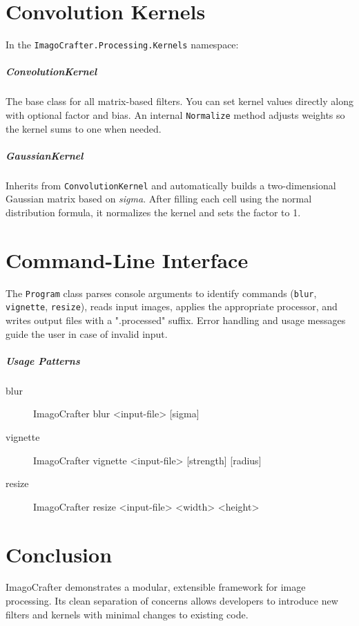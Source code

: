 \documentclass[12pt,a4paper]{report}
\begin{document}
\chapter{Convolution Kernels}
In the \texttt{ImagoCrafter.Processing.Kernels} namespace:

\paragraph{ConvolutionKernel}
The base class for all matrix-based filters. You can set kernel values directly along with optional factor and bias. An internal \texttt{Normalize} method adjusts weights so the kernel sums to one when needed.

\paragraph{GaussianKernel}
Inherits from \texttt{ConvolutionKernel} and automatically builds a two-dimensional Gaussian matrix based on \textit{sigma}. After filling each cell using the normal distribution formula, it normalizes the kernel and sets the factor to 1.

\chapter{Command-Line Interface}
The \texttt{Program} class parses console arguments to identify commands (\texttt{blur}, \texttt{vignette}, \texttt{resize}), reads input images, applies the appropriate processor, and writes output files with a ".processed" suffix. Error handling and usage messages guide the user in case of invalid input.

\paragraph{Usage Patterns}
\begin{description}
  \item[blur]  ImagoCrafter blur <input-file> [sigma]
  \item[vignette]  ImagoCrafter vignette <input-file> [strength] [radius]
  \item[resize]  ImagoCrafter resize <input-file> <width> <height>
\end{description}

\chapter{Conclusion}
ImagoCrafter demonstrates a modular, extensible framework for image processing. Its clean separation of concerns allows developers to introduce new filters and kernels with minimal changes to existing code.
\end{document}
